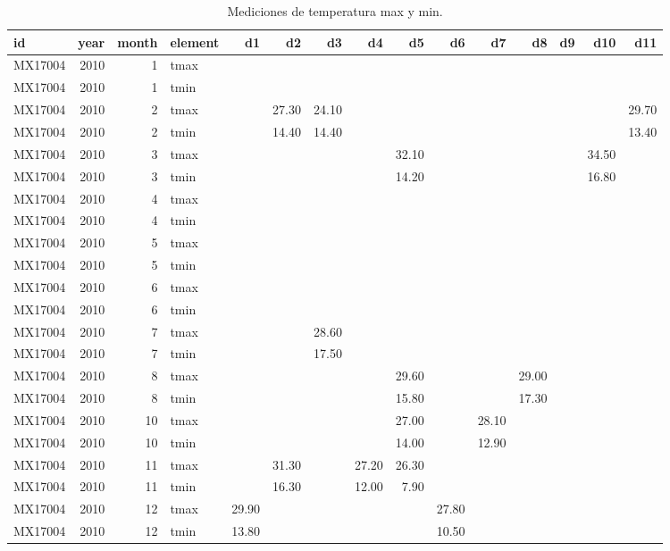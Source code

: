 \documentclass[]{article}
\begin{document}
\begin{table}[ht]
\centering
\begingroup\tiny
\begin{tabular}{lrrlrrrrrrrrrrr}
  \hline
id & year & month & element & d1 & d2 & d3 & d4 & d5 & d6 & d7 & d8 & d9 & d10 & d11 \\ 
  \hline
MX17004 & 2010 &   1 & tmax &  &  &  &  &  &  &  &  &  &  &  \\ 
  MX17004 & 2010 &   1 & tmin &  &  &  &  &  &  &  &  &  &  &  \\ 
  MX17004 & 2010 &   2 & tmax &  & 27.30 & 24.10 &  &  &  &  &  &  &  & 29.70 \\ 
  MX17004 & 2010 &   2 & tmin &  & 14.40 & 14.40 &  &  &  &  &  &  &  & 13.40 \\ 
  MX17004 & 2010 &   3 & tmax &  &  &  &  & 32.10 &  &  &  &  & 34.50 &  \\ 
  MX17004 & 2010 &   3 & tmin &  &  &  &  & 14.20 &  &  &  &  & 16.80 &  \\ 
  MX17004 & 2010 &   4 & tmax &  &  &  &  &  &  &  &  &  &  &  \\ 
  MX17004 & 2010 &   4 & tmin &  &  &  &  &  &  &  &  &  &  &  \\ 
  MX17004 & 2010 &   5 & tmax &  &  &  &  &  &  &  &  &  &  &  \\ 
  MX17004 & 2010 &   5 & tmin &  &  &  &  &  &  &  &  &  &  &  \\ 
  MX17004 & 2010 &   6 & tmax &  &  &  &  &  &  &  &  &  &  &  \\ 
  MX17004 & 2010 &   6 & tmin &  &  &  &  &  &  &  &  &  &  &  \\ 
  MX17004 & 2010 &   7 & tmax &  &  & 28.60 &  &  &  &  &  &  &  &  \\ 
  MX17004 & 2010 &   7 & tmin &  &  & 17.50 &  &  &  &  &  &  &  &  \\ 
  MX17004 & 2010 &   8 & tmax &  &  &  &  & 29.60 &  &  & 29.00 &  &  &  \\ 
  MX17004 & 2010 &   8 & tmin &  &  &  &  & 15.80 &  &  & 17.30 &  &  &  \\ 
  MX17004 & 2010 &  10 & tmax &  &  &  &  & 27.00 &  & 28.10 &  &  &  &  \\ 
  MX17004 & 2010 &  10 & tmin &  &  &  &  & 14.00 &  & 12.90 &  &  &  &  \\ 
  MX17004 & 2010 &  11 & tmax &  & 31.30 &  & 27.20 & 26.30 &  &  &  &  &  &  \\ 
  MX17004 & 2010 &  11 & tmin &  & 16.30 &  & 12.00 & 7.90 &  &  &  &  &  &  \\ 
  MX17004 & 2010 &  12 & tmax & 29.90 &  &  &  &  & 27.80 &  &  &  &  &  \\ 
  MX17004 & 2010 &  12 & tmin & 13.80 &  &  &  &  & 10.50 &  &  &  &  &  \\ 
   \hline
\end{tabular}
\endgroup
\caption{Mediciones de temperatura max y min.} 
\label{tab:clima}
\end{table}
\end{document}
